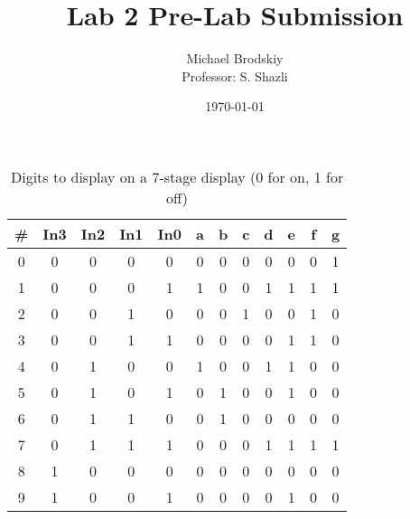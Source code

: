 


\title{Lab 2 Pre-Lab Submission}
\date{\today}
\author{Michael Brodskiy\\ \small Professor: S. Shazli}



\maketitle

\begin{table}
  \centering
  \begin{tabular}[h!]{| c || c | c | c | c || c | c | c | c | c | c | c |}
    \hline
    \# & In3 & In2 & In1 & In0 & a & b & c & d & e & f & g \\
    \hline
    0 & 0 & 0 & 0 & 0 & 0 & 0 & 0 & 0 & 0 & 0 & 1 \\
    \hline 
    1 & 0 & 0 & 0 & 1 & 1 & 0 & 0 & 1 & 1 & 1 & 1 \\
    \hline
    2 & 0 & 0 & 1 & 0 & 0 & 0 & 1 & 0 & 0 & 1 & 0 \\
    \hline
    3 & 0 & 0 & 1 & 1 & 0 & 0 & 0 & 0 & 1 & 1 & 0\\
    \hline
    4 & 0 & 1 & 0 & 0 & 1 & 0 & 0 & 1 & 1 & 0 & 0\\
    \hline
    5 & 0 & 1 & 0 & 1 & 0 & 1 & 0 & 0 & 1 & 0 & 0\\
    \hline
    6 & 0 & 1 & 1 & 0 & 0 & 1 & 0 & 0 & 0 & 0 & 0\\
    \hline
    7 & 0 & 1 & 1 & 1 & 0 & 0 & 0 & 1 & 1 & 1 & 1\\
    \hline
    8 & 1 & 0 & 0 & 0 & 0 & 0 & 0 & 0 & 0 & 0 & 0\\
    \hline
    9 & 1 & 0 & 0 & 1 & 0 & 0 & 0 & 0 & 1 & 0 & 0\\
    \hline
  \end{tabular}
  \caption{Digits to display on a 7-stage display (0 for on, 1 for off)}
\end{table}

\vspace{500pt}



